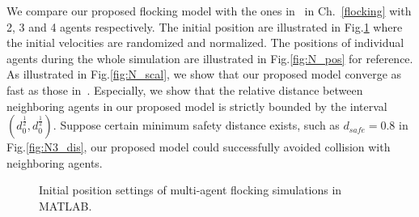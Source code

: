 We compare our proposed flocking model with the ones in~\cite{Vicsek1995,CuckerSmale2007,CuckerDong2010} in Ch.~\ref{flocking} with 2, 3 and 4 agents respectively. The initial position are illustrated in Fig.\ref{fig:simulate_flocking} where the initial velocities are randomized and normalized. The positions of individual agents during the whole simulation are illustrated in Fig.\ref{fig:N_pos} for reference. As illustrated in Fig.\ref{fig:N_scal}, we show that our proposed model converge as fast as those in~\cite{Vicsek1995,CuckerSmale2007,CuckerDong2010}. Especially, we show that the relative distance between neighboring agents in our proposed model is strictly bounded by the interval $(d_0^{\frac{1}{2}}, d_0^{\frac{1}{2}})$. Suppose certain minimum safety distance exists, such as $d_{safe}=0.8$ in Fig.\ref{fig:N3_dis}, our proposed model could successfully avoided collision with neighboring agents.

\begin{figure}[H]
  \centering
  \caption{Initial position settings of multi-agent flocking simulations in MATLAB.}\label{fig:simulate_flocking}
\end{figure}

